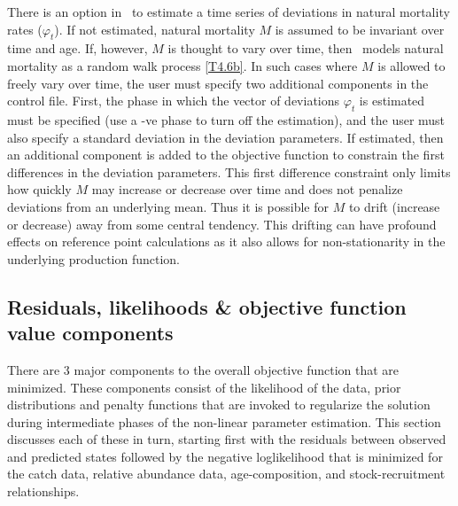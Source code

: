 There is an option in \iscam\ to estimate a time series of deviations in natural mortality rates ($\varphi_t$).  If not estimated, natural mortality $M$ is assumed to be invariant over time and age.  If, however, $M$ is thought to vary over time, then \iscam\ models natural mortality as a random walk process \eqref{T4.6b}.  In such cases where $M$ is allowed to freely vary over time, the user must specify two additional components in the control file. First, the phase in which the vector of deviations $\varphi_t$ is estimated must be specified (use a -ve phase to turn off the estimation), and the user must also specify a standard deviation in the deviation parameters.  If estimated, then an additional component is added to the objective function to constrain the first differences in the deviation parameters.  This first difference constraint only limits how quickly $M$ may increase or decrease over time and does not penalize deviations from an underlying mean.  Thus it is possible for $M$ to drift (increase or decrease) away from some central tendency. This drifting can have profound effects on reference point calculations as it also allows for non-stationarity in the underlying production function.


		
		\subsection{Residuals, likelihoods \& objective function value components}\label{secLikelihoods}

There are 3 major components to the overall objective function that are minimized.  These components consist of the likelihood of the data, prior distributions and penalty functions that are invoked to regularize the solution during intermediate phases of the non-linear parameter estimation.  This section discusses each of these in turn, starting first with the residuals between observed and predicted states followed by the negative loglikelihood that is minimized for the catch data, relative abundance data, age-composition, and stock-recruitment relationships.

